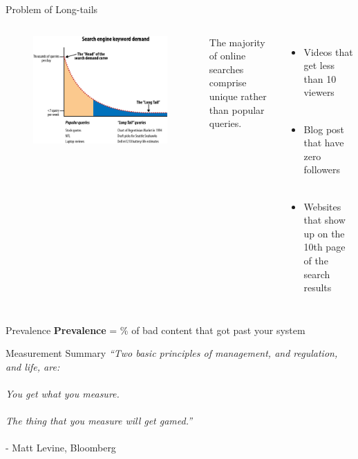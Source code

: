 \documentclass[nobackground,dvipsnames,table,aspectratio=169]{beamer}
\begin{document}
\begin{frame}{Problem of Long-tails}
    \begin{columns}
            \begin{figure}
                \centering
                \includegraphics[width=\textwidth]{long-tail}
            \end{figure}
            The majority of online searches comprise unique rather than popular queries. \\~\\
            \begin{itemize}
                \item Videos that get less than 10 viewers \\~\\
                \item Blog post that have zero followers \\~\\
                \item Websites that show up on the 10th page of the search results
            \end{itemize}
    \end{columns}
\end{frame}

\begin{frame}{Prevalence}
    \textbf{Prevalence} = \% of bad content that got past your system 
\end{frame}

\begin{frame}{Measurement Summary}
    \centering
    \textit{“Two basic principles of management, and regulation, and life, are:} \\~\\
    
    \textit{You get what you measure.} \\~\\
    
    \textit{The thing that you measure will get gamed.”} \\~\\
          - Matt Levine, Bloomberg 
\end{frame}
\end{document}

